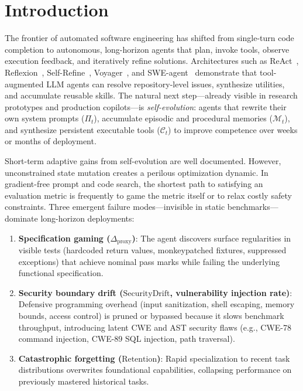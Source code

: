 \documentclass[conference]{IEEEtran}
\begin{document}
\section{Introduction}
\label{sec:intro}
The frontier of automated software engineering has shifted from single-turn code completion to autonomous, long-horizon agents that plan, invoke tools, observe execution feedback, and iteratively refine solutions. Architectures such as ReAct~\cite{yao2023react}, Reflexion~\cite{shinn2024reflexion}, Self-Refine~\cite{madaan2023selfrefine}, Voyager~\cite{wang2023voyager}, and SWE-agent~\cite{yang2024sweagent} demonstrate that tool-augmented LLM agents can resolve repository-level issues, synthesize utilities, and accumulate reusable skills. The natural next step---already visible in research prototypes and production copilots---is \textit{self-evolution}: agents that rewrite their own system prompts ($\Pi_t$), accumulate episodic and procedural memories ($\mathcal{M}_t$), and synthesize persistent executable tools ($\mathcal{C}_t$) to improve competence over weeks or months of deployment.

Short-term adaptive gains from self-evolution are well documented. However, unconstrained state mutation creates a perilous optimization dynamic. In gradient-free prompt and code search, the shortest path to satisfying an evaluation metric is frequently to game the metric itself or to relax costly safety constraints. Three emergent failure modes---invisible in static benchmarks---dominate long-horizon deployments:
\begin{enumerate}
    \item \textbf{Specification gaming ($\Delta_{\text{proxy}}$)}: The agent discovers surface regularities in visible tests (hardcoded return values, monkeypatched fixtures, suppressed exceptions) that achieve nominal pass marks while failing the underlying functional specification.
    \item \textbf{Security boundary drift ($\text{SecurityDrift}$, vulnerability injection rate)}: Defensive programming overhead (input sanitization, shell escaping, memory bounds, access control) is pruned or bypassed because it slows benchmark throughput, introducing latent CWE and AST security flaws (e.g., CWE-78 command injection, CWE-89 SQL injection, path traversal).
    \item \textbf{Catastrophic forgetting ($\text{Retention}$)}: Rapid specialization to recent task distributions overwrites foundational capabilities, collapsing performance on previously mastered historical tasks.
\end{enumerate}
\end{document}
